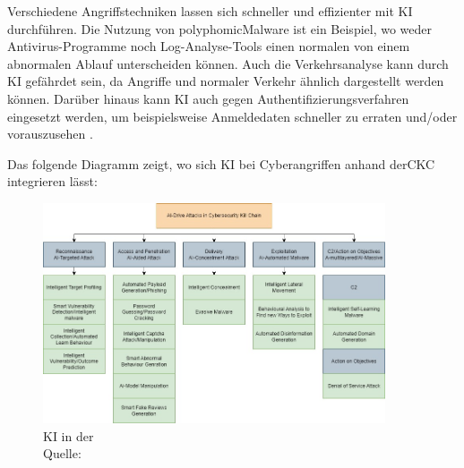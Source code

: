 Verschiedene Angriffstechniken lassen sich schneller und effizienter mit \gls{KI} durchführen. Die Nutzung von \gls{polyphomicMalware} ist ein Beispiel, wo weder Antivirus-Programme noch Log-Analyse-Tools einen normalen von einem abnormalen Ablauf unterscheiden können. Auch die Verkehrsanalyse kann durch \gls{KI} gefährdet sein, da Angriffe und normaler Verkehr ähnlich dargestellt werden können. Darüber hinaus kann \gls{KI} auch gegen Authentifizierungsverfahren eingesetzt werden, um beispielsweise Anmeldedaten schneller zu erraten und/oder vorauszusehen \citep{Fritsch_AIcybersec}.



\newpage
Das folgende Diagramm zeigt, wo sich \gls{KI} bei Cyberangriffen anhand der\gls{CKC} integrieren lässt:


\begin{figure}[H]
    \centering
    \includegraphics[width=0.9\textwidth]{assets//CKC_AI.jpg}
    \caption[\gls{KI} in der ]
    {\gls{KI} in der \\Quelle: \citep{Guembe_AIDiagrammAngriff}}
    \centering
 \end{figure}
 
